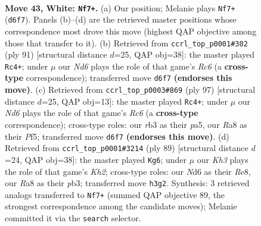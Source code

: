 \documentclass[11pt]{article}
\begin{document}
\clearpage

\begin{figure}[p]\centering
\begin{subfigure}{0.46\textwidth}\centering
\resizebox{\linewidth}{!}{%
\newchessgame
\chessboard[
  setfen={R7/6p1/3Npp1k/1p5p/3P1P1P/1r2P1PK/8/8 w - - 6 43},
  showmover=false,
  pgfstyle=straightmove, color=movearrow, markmove={d6-f7}
]}
\caption{}
\end{subfigure}\hfill
\begin{subfigure}{0.46\textwidth}\centering
\resizebox{\linewidth}{!}{%
\newchessgame
\chessboard[
  setfen={8/R4p2/2p2kp1/1p5p/1P3K1P/P1r2PP1/8/8 b - - 2 46},
  showmover=false,
  pgfstyle=straightmove, color=movearrow, markmove={c3-c4}
]}
\caption{}
\end{subfigure}
\\[4pt]
\begin{subfigure}{0.46\textwidth}\centering
\resizebox{\linewidth}{!}{%
\newchessgame
\chessboard[
  setfen={8/1p1k3p/p3p2P/P2pPp2/1P3K2/2r1P1P1/8/1R6 b - - 2 49},
  showmover=false,
  pgfstyle=straightmove, color=movearrow, markmove={c3-c4}
]}
\caption{}
\end{subfigure}\hfill
\begin{subfigure}{0.46\textwidth}\centering
\resizebox{\linewidth}{!}{%
\newchessgame
\chessboard[
  setfen={4r3/6pk/1p1RPp1p/p1p5/P5P1/1P5P/6K1/8 b - - 2 45},
  showmover=false,
  pgfstyle=straightmove, color=movearrow, markmove={h7-g6}
]}
\caption{}
\end{subfigure}
\caption{\textbf{Move 43, White: \texttt{Nf7+}.} (a) Our position; Melanie plays \texttt{Nf7+} (\texttt{d6f7}). Panels (b)--(d) are the retrieved master positions whose correspondence most drove this move (highest QAP objective among those that transfer to it). (b) Retrieved from \texttt{ccrl\_top\_p0001\#302} (ply 91) [structural distance $d$=25, QAP obj=38]: the master played \texttt{Rc4+}; under $\mu$ our \emph{Nd6} plays the role of that game's \emph{Rc6} (a \textbf{cross-type} correspondence); transferred move \texttt{d6f7} \textbf{(endorses this move)}. (c) Retrieved from \texttt{ccrl\_top\_p0003\#869} (ply 97) [structural distance $d$=25, QAP obj=13]: the master played \texttt{Rc4+}; under $\mu$ our \emph{Nd6} plays the role of that game's \emph{Rc6} (a \textbf{cross-type} correspondence); cross-type roles: our \emph{r}b3 as their \emph{p}a5, our \emph{R}a8 as their \emph{P}f5; transferred move \texttt{d6f7} \textbf{(endorses this move)}. (d) Retrieved from \texttt{ccrl\_top\_p0001\#3214} (ply 89) [structural distance $d$=24, QAP obj=38]: the master played \texttt{Kg6}; under $\mu$ our \emph{Kh3} plays the role of that game's \emph{Kh2}; cross-type roles: our \emph{N}d6 as their \emph{R}e8, our \emph{R}a8 as their \emph{p}b3; transferred move \texttt{h3g2}. Synthesis: 3 retrieved analogs transferred to \texttt{Nf7+} (summed QAP objective 89, the strongest correspondence among the candidate moves); Melanie committed it via the \texttt{search} selector.}
\label{fig:thought-m84}
\end{figure}
\end{document}
